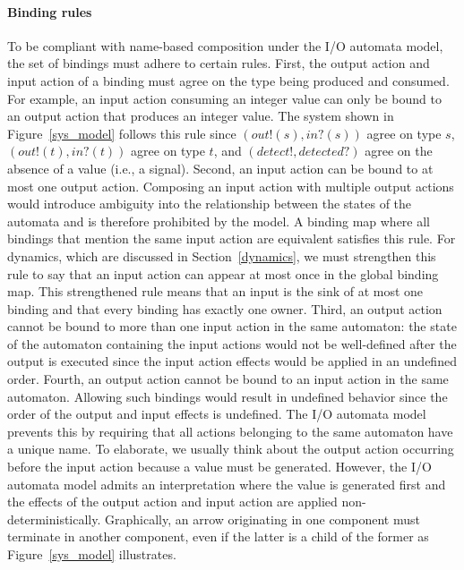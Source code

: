 \paragraph*{Binding rules}
To be compliant with name-based composition under the I/O automata model, the set of bindings must adhere to certain rules.
First, the output action and input action of a binding must agree on the type being produced and consumed.
For example, an input action consuming an integer value can only be bound to an output action that produces an integer value.
The system shown in Figure~\ref{sys_model} follows this rule since $(out!(s), in?(s))$ agree on type $s$, $(out!(t), in?(t))$ agree on type $t$, and $(detect!, detected?)$ agree on the absence of a value (i.e., a signal).
Second, an input action can be bound to at most one output action.
Composing an input action with multiple output actions would introduce ambiguity into the relationship between the states of the automata and is therefore prohibited by the model.
A binding map where all bindings that mention the same input action are equivalent satisfies this rule.
For dynamics, which are discussed in Section~\ref{dynamics}, we must strengthen this rule to say that an input action can appear at most once in the global binding map.
This strengthened rule means that an input is the sink of at most one binding and that every binding has exactly one owner.
Third, an output action cannot be bound to more than one input action in the same automaton:  the state of the automaton containing the input actions would not be well-defined after the output is executed since the input action effects would be applied in an undefined order.
Fourth, an output action cannot be bound to an input action in the same automaton.
Allowing such bindings would result in undefined behavior since the order of the output and input effects is undefined.
The I/O automata model prevents this by requiring that all actions belonging to the same automaton have a unique name.
To elaborate, we usually think about the output action occurring before the input action because a value must be generated.
However, the I/O automata model admits an interpretation where the value is generated first and the effects of the output action and input action are applied non-deterministically.
Graphically, an arrow originating in one component must terminate in another component, even if the latter is a child of the former as Figure~\ref{sys_model} illustrates.

